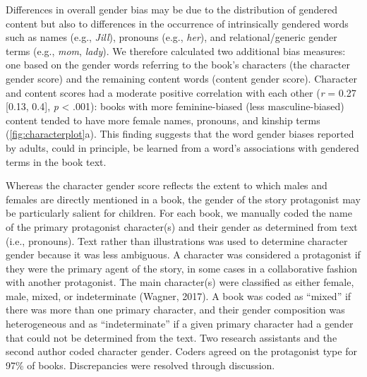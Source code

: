 \documentclass[
  english,
  ,man,floatsintext]{apa6}
\begin{document}
Differences in overall gender bias may be due to the distribution of gendered content but also to differences in the occurrence of intrinsically gendered words such as names (e.g., \emph{Jill}), pronouns (e.g., \emph{her}), and relational/generic gender terms (e.g., \emph{mom}, \emph{lady}). We therefore calculated two additional bias measures: one based on the gender words referring to the book's characters (the character gender score) and the remaining content words (content gender score). Character and content scores had a moderate positive correlation with each other (\emph{r} = 0.27 {[}0.13, 0.4{]}, \emph{p} \textless{} .001): books with more feminine-biased (less masculine-biased) content tended to have more female names, pronouns, and kinship terms (\autoref{fig:characterplot}a). This finding suggests that the word gender biases reported by adults, could in principle, be learned from a word's associations with gendered terms in the book text.

Whereas the character gender score reflects the extent to which males and females are directly mentioned in a book, the gender of the story protagonist may be particularly salient for children. For each book, we manually coded the name of the primary protagonist character(s) and their gender as determined from text (i.e., pronouns). Text rather than illustrations was used to determine character gender because it was less ambiguous. A character was considered a protagonist if they were the primary agent of the story, in some cases in a collaborative fashion with another protagonist. The main character(s) were classified as either female, male, mixed, or indeterminate (Wagner, 2017). A book was coded as \enquote{mixed} if there was more than one primary character, and their gender composition was heterogeneous and as \enquote{indeterminate} if a given primary character had a gender that could not be determined from the text. Two research assistants and the second author coded character gender. Coders agreed on the protagonist type for 97\% of books. Discrepancies were resolved through discussion.
\end{document}
